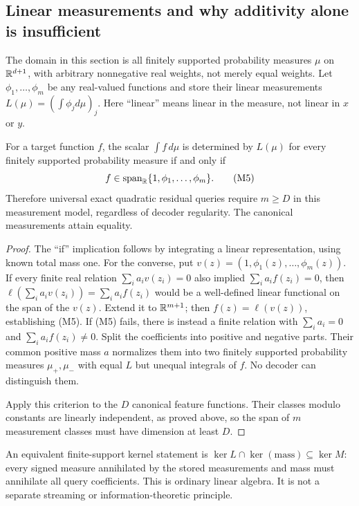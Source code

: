\subsection{Linear measurements and why additivity alone is insufficient}

The domain in this section is all finitely supported probability
measures $\mu$ on $\mathbb R^{d+1}$, with arbitrary nonnegative real weights,
not merely equal weights. Let $\phi_1,\ldots,\phi_m$ be any real-valued
functions and store their linear measurements $L(\mu)=(\int\phi_jd\mu)_j$.
Here ``linear'' means linear in the measure, not linear in $x$ or $y$.

\begin{proposition}
\label{prop:memory-linear}
For a target function $f$, the scalar $\int f\,d\mu$ is determined
by $L(\mu)$ for every finitely supported probability measure if and
only if
\[
 f\in\operatorname{span}_{\mathbb R}\{1,\phi_1,\ldots,\phi_m\}.
 \tag{M5}
\]
Therefore universal exact quadratic residual queries require
$m\ge D$ in this measurement model, regardless of decoder regularity.
The canonical measurements attain equality.
\end{proposition}
\begin{proof}
The ``if'' implication follows by integrating a linear representation,
using known total mass one. For the converse, put
$v(z)=(1,\phi_1(z),\ldots,\phi_m(z))$. If every finite real relation
$\sum_i a_iv(z_i)=0$ also implied $\sum_i a_if(z_i)=0$, then
$\ell(\sum_i a_iv(z_i))=\sum_i a_if(z_i)$ would be a well-defined
linear functional on the span of the $v(z)$. Extend it to $\mathbb R^{m+1}$;
then $f(z)=\ell(v(z))$, establishing (M5).
If (M5) fails, there is instead a finite relation with
$\sum_i a_i=0$ and $\sum_i a_if(z_i)\ne0$. Split the coefficients
into positive and negative parts. Their common positive mass $a$
normalizes them into two finitely supported probability measures
$\mu_+,\mu_-$ with equal $L$ but unequal integrals of $f$.
No decoder can distinguish them.

Apply this criterion to the $D$ canonical feature functions. Their
classes modulo constants are linearly independent, as proved above,
so the span of $m$ measurement classes must have dimension at least
$D$.
\end{proof}

An equivalent finite-support kernel statement is
$\ker L\cap\ker(\text{mass})\subseteq\ker M$: every signed measure
annihilated by the stored measurements and mass must annihilate all
query coefficients. This is ordinary linear algebra. It is not a
separate streaming or information-theoretic principle.

